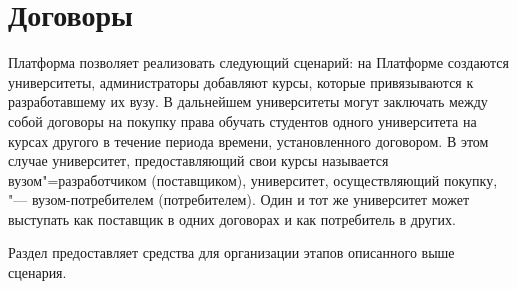 \graphicspath{{images/agreement/}}

\section{Договоры}
Платформа позволяет реализовать следующий сценарий: на Платформе создаются университеты, администраторы добавляют курсы, которые привязываются к разработавшему их вузу. В дальнейшем университеты могут заключать между собой договоры на покупку права обучать студентов одного университета на курсах другого в течение периода времени, установленного договором. В этом случае университет, предоставляющий свои курсы называется вузом"=разработчиком (поставщиком), университет, осуществляющий покупку, "--- вузом-потребителем (потребителем). Один и тот же университет может выступать как поставщик в одних договорах и как потребитель в других.

Раздел  предоставляет средства для организации этапов описанного выше сценария.

